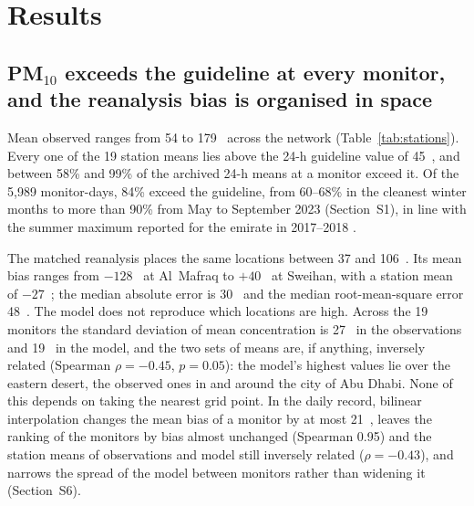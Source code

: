 \section{Results}

\subsection{PM$_{10}$ exceeds the guideline at every monitor, and the reanalysis bias is organised
in space}
\label{sec:res-bias}

Mean observed \pmten{} ranges from 54 to 179~\ugm{} across the network
(Table~\ref{tab:stations}). Every one of the 19 station means lies above the 24-h guideline value
of 45~\ugm{}, and between 58\% and 99\% of the archived 24-h means at a monitor exceed it. Of the
5,989 monitor-days, 84\% exceed the guideline, from 60--68\% in the cleanest winter months to
more than 90\% from May to September 2023 (Section~S1), in line with the summer maximum reported
for the emirate in 2017--2018 \citep{abuelgasim2020}.

The matched reanalysis places the same locations between 37 and 106~\ugm{}. Its mean bias ranges
from $-128$~\ugm{} at Al~Mafraq to $+40$~\ugm{} at Sweihan, with a station mean of $-27$~\ugm{};
the median absolute error is 30~\ugm{} and the median root-mean-square error 48~\ugm{}. The model
does not reproduce which locations are high. Across the 19 monitors the standard deviation of
mean concentration is 27~\ugm{} in the observations and 19~\ugm{} in the model, and the two sets
of means are, if anything, inversely related (Spearman $\rho=-0.45$, $p=0.05$): the model's
highest values lie over the eastern desert, the observed ones in and around the city of Abu Dhabi.
None of this depends on taking the nearest grid point. In the daily record, bilinear interpolation
changes the mean bias of a monitor by at most 21~\ugm{}, leaves the ranking of the monitors by
bias almost unchanged (Spearman 0.95) and the station means of observations and model still
inversely related ($\rho=-0.43$), and narrows the spread of the model between monitors rather
than widening it (Section~S6).

